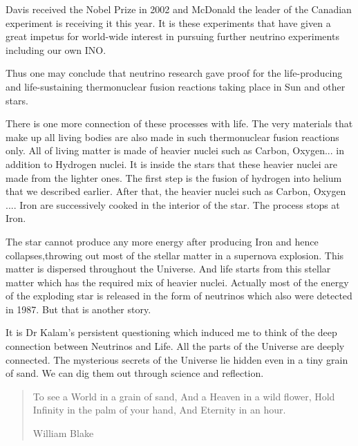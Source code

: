 Davis received the Nobel Prize in 2002 and McDonald the leader
of the Canadian experiment is receiving it this year. It is 
these experiments that have given a great impetus for world-wide
interest in pursuing further neutrino experiments including 
our own INO.

Thus one may conclude that neutrino research gave proof for
the life-producing and life-sustaining thermonuclear fusion
reactions taking place in Sun and other stars.

There is one more connection of these processes with life. The very
materials that make up all living bodies are also made in
such thermonuclear fusion reactions only. All of living matter
is made of heavier nuclei such as Carbon, Oxygen... in
addition to Hydrogen nuclei. It is inside the stars that these
heavier nuclei are made from the lighter ones. The first step
is the fusion of hydrogen into helium that we described
earlier. After that, the heavier nuclei such as Carbon, Oxygen 
.... Iron are successively cooked in the interior of the star.
The process stops at Iron. 

The star cannot produce any more energy 
after producing Iron and hence collapses,throwing out
most of the stellar matter in a supernova explosion. This
matter is dispersed throughout the Universe. And life starts
from this stellar matter which has the required mix of
heavier nuclei. Actually most of the energy of the exploding
star is released in the form of neutrinos which also were
detected in 1987. But that is another story.

It is Dr Kalam's persistent questioning which induced
me to think of the deep connection between Neutrinos and
Life. All the parts of the Universe are deeply connected.
The mysterious secrets of the Universe lie hidden even
in a tiny grain of sand. We can dig them out through 
science and reflection.

\begin{quote} 
        To see a World in a grain of sand,
        And a Heaven in a wild flower,
        Hold Infinity in the palm of your hand,
        And Eternity in an hour.
                             
                                William Blake
\end{quote} 
